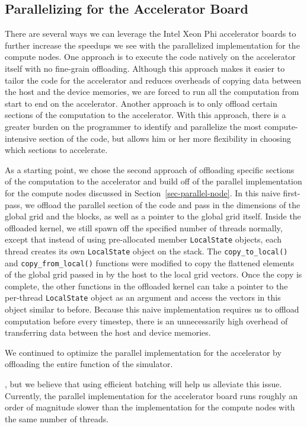 
\subsection{Parallelizing for the Accelerator Board}
\label{sec-parallel-device}

There are several ways we can leverage the Intel Xeon Phi accelerator
boards to further increase the speedups we see with the parallelized
implementation for the compute nodes. One approach is to execute the code
natively on the accelerator itself with no fine-grain
offloading. Although this approach makes it easier to tailor the code for
the accelerator and reduces overheads of copying data between the host
and the device memories, we are forced to run all the computation from
start to end on the accelerator. Another approach is to only offload
certain sections of the computation to the accelerator. With this
approach, there is a greater burden on the programmer to identify and
parallelize the most compute-intensive section of the code, but allows
him or her more flexibility in choosing which sections to accelerate.

As a starting point, we chose the second approach of offloading specific
sections of the computation to the accelerator and build off of the
parallel implementation for the compute nodes discussed in
Section~\ref{sec-parallel-node}. In this naive first-pass, we offload the
parallel section of the code and pass in the dimensions of the global
grid and the blocks, as well as a pointer to the global grid
itself. Inside the offloaded kernel, we still spawn off the specified
number of threads normally, except that instead of using pre-allocated
member \texttt{LocalState} objects, each thread creates its own \texttt{LocalState} object
on the stack. The \texttt{copy\_to\_local()} and
\texttt{copy\_from\_local()} functions were modified to copy the
flattened elements of the global grid passed in by the host to the local
grid vectors. Once the copy is complete, the other functions in the
offloaded kernel can take a pointer to the per-thread \texttt{LocalState} object
as an argument and access the vectors in this object similar to before.
Because this naive implementation requires us to offload computation
before every timestep, there is an unnecessarily high overhead of
transferring data between the host and device memories.

We continued to optimize the parallel implementation for the accelerator
by offloading the entire  function of the simulator.

, but we believe
that using efficient batching will help us alleviate this
issue. Currently, the parallel implementation for the accelerator board
runs roughly an order of magnitude slower than the implementation for the
compute nodes with the same number of threads.
